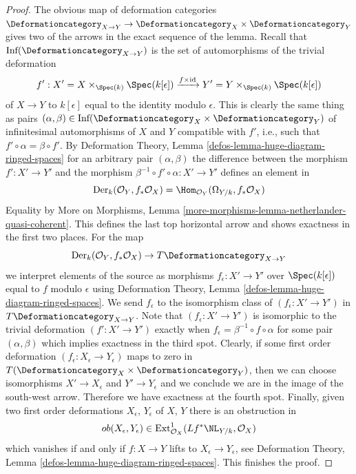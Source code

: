\begin{proof}
The obvious map of deformation categories
$\Deformationcategory_{X \to Y} \to
\Deformationcategory_X \times \Deformationcategory_Y$
gives two of the arrows in the exact sequence of the lemma.
Recall that $\text{Inf}(\Deformationcategory_{X \to Y})$
is the set of automorphisms of the trivial deformation
$$
f' :  X' = X \times_{\Spec(k)} \Spec(k[\epsilon])
\xrightarrow{f \times \text{id}}
Y' = Y \times_{\Spec(k)} \Spec(k[\epsilon])
$$
of $X \to Y$ to $k[\epsilon]$ equal to the identity modulo $\epsilon$.
This is clearly the same thing as pairs
$(\alpha, \beta) \in
\text{Inf}(\Deformationcategory_X \times \Deformationcategory_Y)$
of infinitesimal automorphisms of $X$ and $Y$ compatible with $f'$, i.e.,
such that $f' \circ \alpha = \beta \circ f'$.
By Deformation Theory, Lemma \ref{defos-lemma-huge-diagram-ringed-spaces}
for an arbitrary pair $(\alpha, \beta)$ the difference between
the morphism $f' : X' \to Y'$ and the morphism
$\beta^{-1} \circ f' \circ \alpha : X' \to Y'$ defines an element
in
$$
\text{Der}_k(\mathcal{O}_Y, f_*\mathcal{O}_X) =
\Hom_{\mathcal{O}_Y}(\Omega_{Y/k}, f_*\mathcal{O}_X)
$$
Equality by More on Morphisms, Lemma
\ref{more-morphisms-lemma-netherlander-quasi-coherent}.
This defines the last top horizontal arrow and shows exactness
in the first two places. For the map
$$
\text{Der}_k(\mathcal{O}_Y, f_*\mathcal{O}_X)
\to
T\Deformationcategory_{X \to Y}
$$
we interpret elements of the source as morphisms
$f_\epsilon : X' \to Y'$ over $\Spec(k[\epsilon])$
equal to $f$ modulo $\epsilon$
using Deformation Theory, Lemma \ref{defos-lemma-huge-diagram-ringed-spaces}.
We send $f_\epsilon$ to the isomorphism class of
$(f_\epsilon : X' \to Y')$ in $T\Deformationcategory_{X \to Y}$.
Note that $(f_\epsilon : X' \to Y')$ is isomorphic to the
trivial deformation $(f' : X' \to Y')$ exactly when
$f_\epsilon  = \beta^{-1} \circ f \circ \alpha$ for some
pair $(\alpha, \beta)$ which implies exactness in the third spot.
Clearly, if some first order deformation
$(f_\epsilon : X_\epsilon \to Y_\epsilon)$
maps to zero in $T(\Deformationcategory_X \times \Deformationcategory_Y)$,
then we can choose isomorphisms $X' \to X_\epsilon$ and $Y' \to Y_\epsilon$
and we conclude we are in the image of the south-west arrow.
Therefore we have exactness at the fourth spot.
Finally, given two first order deformations $X_\epsilon$, $Y_\epsilon$
of $X$, $Y$ there is an obstruction in
$$
ob(X_\epsilon, Y_\epsilon) \in
\text{Ext}^1_{\mathcal{O}_X}(Lf^*\NL_{Y/k}, \mathcal{O}_X)
$$
which vanishes if and only if $f : X \to Y$ lifts to
$X_\epsilon \to Y_\epsilon$, see
Deformation Theory, Lemma \ref{defos-lemma-huge-diagram-ringed-spaces}.
This finishes the proof.
\end{proof}

